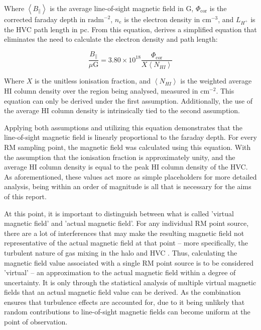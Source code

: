 Where $\left<B_{\parallel}\right>$ is the average line-of-sight magnetic field in \textmu G, $\Phi_{\mathrm{cor}}$ is the corrected faraday depth in $\mathrm{rad m}^{-2}$, $n_e$ is the electron density in $\mathrm{cm}^{-3}$, and $L_{H^+}$ is the HVC path length in pc. From this equation, \cite{ID27} derives a simplified equation that eliminates the need to calculate the electron density and path length:


\begin{equation}
    \frac{B_{\parallel}}{\mu\mathrm{G}}=3.80\times10^{18}\frac{\Phi_{\mathrm{cor}}}{X\left<N_{HI}\right>}
\label{eq:the_equation}
\end{equation}


Where $X$ is the unitless ionisation fraction, and $\left<N_{HI}\right>$ is the weighted average HI column density over the region being analysed, measured in $\mathrm{cm}^{-2}$. This equation can only be derived under the first assumption. Additionally, the use of the average HI column density is intrinsically tied to the second assumption.


Applying both assumptions and utilizing this equation demonstrates that the line-of-sight magnetic field is linearly proportional to the faraday depth. For every RM sampling point, the magnetic field was calculated using this equation. With the assumption that the ionisation fraction is approximately unity, and the average HI column density is equal to the peak HI column density of the HVC. As aforementioned, these values act more as simple placeholders for more detailed analysis, being within an order of magnitude is all that is necessary for the aims of this report.


At this point, it is important to distinguish between what is called 'virtual magnetic field' and 'actual magnetic field'. For any individual RM point source, there are a lot of interferences that may make the resulting magnetic field not representative of the actual magnetic field at that point – more specifically, the turbulent nature of gas mixing in the halo and HVC \citep{ID69, ID30, ID16}. Thus, calculating the magnetic field value associated with a single RM point source is to be considered 'virtual' – an approximation to the actual magnetic field within a degree of uncertainty. It is only through the statistical analysis of multiple virtual magnetic fields that an actual magnetic field value can be derived. As the combination ensures that turbulence effects are accounted for, due to it being unlikely that random contributions to line-of-sight magnetic fields can become uniform at the point of observation.


